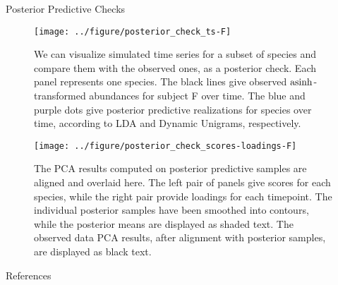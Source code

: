 \documentclass[final, 8pt]{beamer}
\newlength{\onecolwid}
\begin{document}
\begin{frame}
\begin{columns}
\begin{column}{\onecolwid}
\begin{block}{Posterior Predictive Checks}
\end{block}

\begin{figure}[!p]
  \centering
  \texttt{[image: ../figure/posterior\_check\_ts-F]}
  \caption{We can visualize simulated time series for a subset of species and
    compare them with the observed ones, as a posterior check. Each panel
    represents one species. The black lines give observed $\mathop\mathrm{asinh}$-transformed
    abundances for subject F over time. The blue and purple dots give posterior
    predictive realizations for species over time, according to LDA and Dynamic
    Unigrams, respectively.
    \label{fig:antibiotics_posterior_ts}}
\end{figure}

\begin{figure}[!p]
  \centering
  \texttt{[image: ../figure/posterior\_check\_scores-loadings-F]}
  \caption{
    The PCA results computed on posterior predictive samples are aligned and
    overlaid here. The left pair of panels give scores for each species, while
    the right pair provide loadings for each timepoint. The individual posterior
    samples have been smoothed into contours, while the posterior means are
    displayed as shaded text. The observed data PCA results, after alignment
    with posterior samples, are displayed as black
    text. \label{fig:antibiotics_posterior_pca} }
\end{figure}


\begin{block}{References}


\end{block}

\end{column}
\end{columns}


\end{frame}
\end{document}

